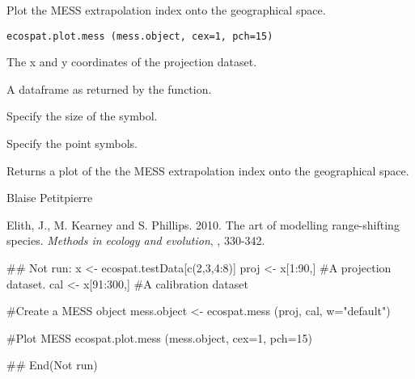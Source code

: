 \documentclass[a4paper]{book}
\begin{document}
%
\begin{Description}\relax
Plot the MESS extrapolation index onto the geographical space.
\end{Description}
%
\begin{Usage}
\begin{verbatim}
ecospat.plot.mess (mess.object, cex=1, pch=15)
\end{verbatim}
\end{Usage}
%
\begin{Arguments}
\begin{ldescription}
\item[\code{xy}] The x and y coordinates of the projection dataset.
\item[\code{mess.object}] A dataframe as returned by the  function.
\item[\code{cex}] Specify the size of the symbol.
\item[\code{pch}] Specify the point symbols.
\end{ldescription}
\end{Arguments}
%
\begin{Value}
Returns a plot of the the MESS extrapolation index onto the geographical space.
\end{Value}
%
\begin{Author}\relax
Blaise Petitpierre 
\end{Author}
%
\begin{References}\relax
Elith, J., M. Kearney and S. Phillips. 2010. The art of modelling range-shifting species. \emph{Methods in ecology and evolution}, , 330-342.
\end{References}
%
\begin{SeeAlso}\relax
{}
\end{SeeAlso}
%
\begin{Examples}
\begin{ExampleCode}
## Not run: 
x <- ecospat.testData[c(2,3,4:8)]
proj <- x[1:90,] #A projection dataset.
cal <- x[91:300,] #A calibration dataset

#Create a MESS object 
mess.object <- ecospat.mess (proj, cal, w="default")

#Plot MESS 
ecospat.plot.mess (mess.object, cex=1, pch=15)

## End(Not run)
\end{ExampleCode}
\end{Examples}
\end{document}
